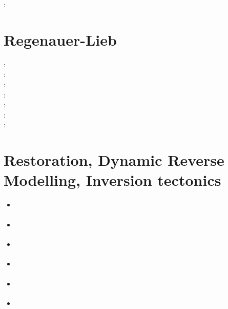 \begin{scriptsize}
\twothousandthirteen: \textcite{orwa13}
\end{scriptsize}

\section{Regenauer-Lieb}

{\scriptsize
\twothousand: \cite{reyu98}\\
\twothousand: \cite{reyu00}\\
\twothousandthree: \cite{reyu03}\\
\twothousandfour: \cite{reyu04}\\
\twothousandsix: \cite{rehy06}\cite{rewr06}\\
\twothousandnine: \cite{reps09}\\
\twothousandthirteen: \cite{revp13}
}

\section{Restoration, Dynamic Reverse Modelling, Inversion tectonics}

\begin{scriptsize}
\begin{itemize}
\item[\twothousandone] 
\textcite{istv01} 
\item[\twothousandfour] 
\textcite{istt04} 
\item[\twothousandfive] 
\textcite{koma05} 
\item[\twothousandtwelve] 
\textcite{lofg12} 
\item[\twothousandeighteen] 
\textcite{lojm18} 
\item[\twothousandtwenty] 
\textcite{sctc20} 
\textcite{taas20} 
\end{itemize}
\end{scriptsize}


